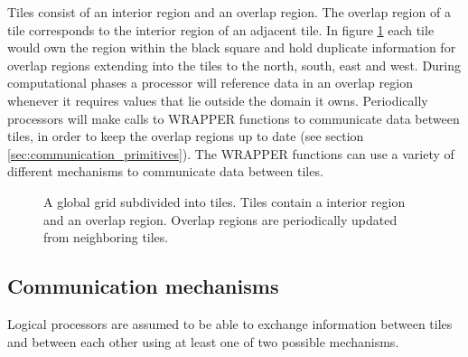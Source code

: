 Tiles consist of an interior region and an overlap region.  The
overlap region of a tile corresponds to the interior region of an
adjacent tile.  In figure \ref{fig:tiledworld} each tile would own the
region within the black square and hold duplicate information for
overlap regions extending into the tiles to the north, south, east and
west.  During computational phases a processor will reference data in
an overlap region whenever it requires values that lie outside the
domain it owns.  Periodically processors will make calls to WRAPPER
functions to communicate data between tiles, in order to keep the
overlap regions up to date (see section
\ref{sec:communication_primitives}).  The WRAPPER functions can use a
variety of different mechanisms to communicate data between tiles.

\begin{figure}
\begin{center}
\end{center}
\caption{ A global grid subdivided into tiles.
Tiles contain a interior region and an overlap region.
Overlap regions are periodically updated from neighboring tiles.
} \label{fig:tiledworld} 
\end{figure}

\subsection{Communication mechanisms}

Logical processors are assumed to be able to exchange information
between tiles and between each other using at least one of two
possible mechanisms.

